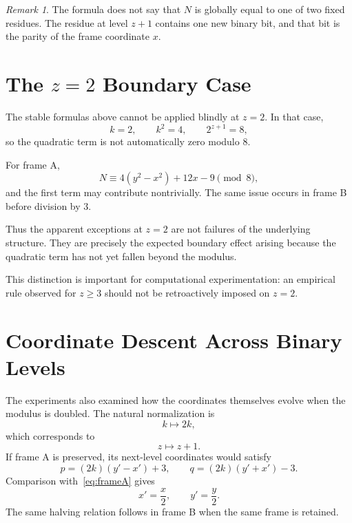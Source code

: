 \documentclass[11pt,a4paper]{article}
\theoremstyle{definition}
\theoremstyle{remark}
\newtheorem{remark}{Remark}
\begin{document}
\begin{remark}
The formula does not say that $N$ is globally equal to one of two fixed residues. The residue at level $z+1$ contains one new binary bit, and that bit is the parity of the frame coordinate $x$.
\end{remark}

\section{The $z=2$ Boundary Case}

The stable formulas above cannot be applied blindly at $z=2$. In that case,
\[
k=2,
\qquad
k^2=4,
\qquad
2^{z+1}=8,
\]
so the quadratic term is not automatically zero modulo $8$.

For frame A,
\begin{equation}
N\equiv4(y^2-x^2)+12x-9\pmod8,
\end{equation}
and the first term may contribute nontrivially. The same issue occurs in frame B before division by $3$.

Thus the apparent exceptions at $z=2$ are not failures of the underlying structure. They are precisely the expected boundary effect arising because the quadratic term has not yet fallen beyond the modulus.

This distinction is important for computational experimentation: an empirical rule observed for $z\ge3$ should not be retroactively imposed on $z=2$.

\section{Coordinate Descent Across Binary Levels}

The experiments also examined how the coordinates themselves evolve when the modulus is doubled. The natural normalization is
\begin{equation}
 k\mapsto2k,
\end{equation}
which corresponds to
\[
z\mapsto z+1.
\]
If frame A is preserved, its next-level coordinates would satisfy
\begin{equation}
 p=(2k)(y'-x')+3,
\qquad
 q=(2k)(y'+x')-3.
\end{equation}
Comparison with~\eqref{eq:frameA} gives
\begin{equation}
 x'=\frac{x}{2},
\qquad
 y'=\frac{y}{2}.
\label{eq:halving}
\end{equation}
The same halving relation follows in frame B when the same frame is retained.
\end{document}
